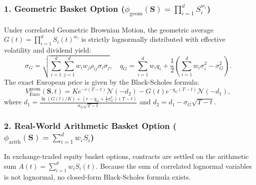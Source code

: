 \documentclass[11pt,a4paper]{article}
\begin{document}
\subsubsection{1. Geometric Basket Option \texorpdfstring{($\phi_{\text{geom}}(\mathbf{S}) = \prod_{i=1}^d S_i^{w_i}$)}{(Geometric Basket)}}
Under correlated Geometric Brownian Motion, the geometric average $G(t) = \prod_{i=1}^d S_i(t)^{w_i}$ is strictly lognormally distributed with effective volatility and dividend yield:
\begin{equation}
\label{eq:geom_params}
\sigma_G = \sqrt{ \sum_{i=1}^d \sum_{j=1}^d w_i w_j \rho_{ij} \sigma_i \sigma_j }, \quad q_G = \sum_{i=1}^d w_i q_i + \frac{1}{2}\left( \sum_{i=1}^d w_i \sigma_i^2 - \sigma_G^2 \right).
\end{equation}
The exact European price is given by the Black-Scholes formula:
\begin{equation}
\label{eq:geom_euro_formula}
V_{\text{Euro}}^{\text{geom}}(\mathbf{S}, t) = K e^{-r(T-t)} \mathcal{N}(-d_2) - G(t) e^{-q_G(T-t)} \mathcal{N}(-d_1),
\end{equation}
where $d_1 = \frac{\ln(G(t)/K) + (r - q_G + \frac{1}{2}\sigma_G^2)(T-t)}{\sigma_G \sqrt{T-t}}$ and $d_2 = d_1 - \sigma_G \sqrt{T-t}$.

\subsubsection{2. Real-World Arithmetic Basket Option \texorpdfstring{($\phi_{\text{arith}}(\mathbf{S}) = \sum_{i=1}^d w_i S_i$)}{(Arithmetic Basket)}}
In exchange-traded equity basket options, contracts are settled on the arithmetic sum $A(t) = \sum_{i=1}^d w_i S_i(t)$. Because the sum of correlated lognormal variables is not lognormal, no closed-form Black-Scholes formula exists. 
\end{document}
